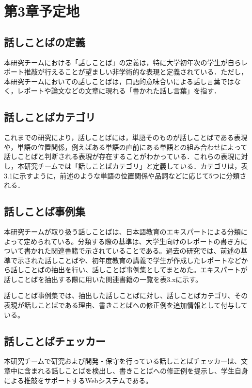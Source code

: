 \chapter{第3章予定地\label{c3}}


\section{話しことばの定義 \label{c3s1}}
本研究チームにおける「話しことば」の定義は，特に大学初年次の学生が自らレポート推敲が行えることが望ましい非学術的な表現と定義されている．ただし，本研究チームにおいての話しことばは，口語的意味合いによる話し言葉ではなく，レポートや論文などの文章に現れる「書かれた話し言葉」を指す．

\section{話しことばカテゴリ \label{c3s2}}
これまでの研究により，話しことばには，単語そのものが話しことばである表現や，単語の位置関係，例えばある単語の直前にある単語との組み合わせによって話しことばと判断される表現が存在することがわかっている．これらの表現に対し，本研究チームでは「話しことばカテゴリ」と定義している．カテゴリは，表3.1に示すように，前述のような単語の位置関係や品詞などに応じて5つに分類される．



\section{話しことば事例集 \label{c3s3}}
本研究チームが取り扱う話しことばは、日本語教育のエキスパートによる分類によって定められている。分類する際の基準は、大学生向けのレポートの書き方について書かれた関連書籍で示されていることである。過去の研究では、前述の基準で示された話しことばや、初年度教育の講義で学生が作成したレポートなどから話しことばの抽出を行い、話しことば事例集としてまとめた。エキスパートが話しことばを抽出する際に用いた関連書籍の一覧を表3.xに示す。



話しことば事例集では、抽出した話しことばに対し、話しことばカテゴリ、その表現が話しことばである理由、書きことばへの修正例を追加情報として付与している。



\section{話しことばチェッカー \label{c3s4}}
本研究チームで研究および開発・保守を行っている話しことばチェッカーは、文章中に含まれる話しことばを検出し、書きことばへの修正例を提示し、学生自身による推敲をサポートするWebシステムである。

